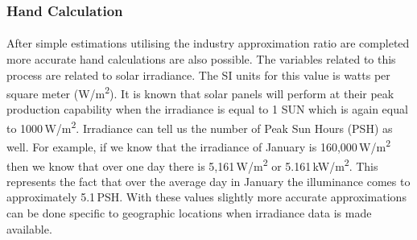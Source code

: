 \subsubsection{Hand Calculation}

\paragraph{}
After simple estimations utilising the industry approximation ratio are completed more accurate hand calculations are also possible. The variables related to this process are related to solar irradiance. The SI units for this value is watts per square meter (W/\si{m^2}). It is known that solar panels will perform at their peak production capability when the irradiance is equal to 1 SUN which is again equal to 1000\,W/\si{m^2}. Irradiance can tell us the number of Peak Sun Hours (PSH) as well. For example, if we know that the irradiance of January is 160,000\,W/\si{m^2} then we know that over one day there is 5,161\,W/\si{m^2} or 5.161\,kW/\si{m^2}. This represents the fact that over the average day in January the illuminance comes to approximately 5.1\,PSH. With these values slightly more accurate approximations can be done specific to geographic locations when irradiance data is made available.       
    